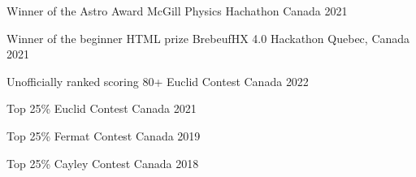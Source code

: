 



\begin{cvhonors}

  \cvhonor
    {Winner of the Astro Award} %
    {McGill Physics Hachathon} %
    {Canada} %
    {2021} %

  \cvhonor
    {Winner of the beginner HTML prize} %
    {BrebeufHX 4.0 Hackathon} %
    {Quebec, Canada} %
    {2021} %






  \cvhonor
    {Unofficially ranked scoring 80+} %
    {Euclid Contest} %
    {Canada} %
    {2022} %
    
  \cvhonor
    {Top 25\%} %
    {Euclid Contest} %
    {Canada} %
    {2021} %
    
  \cvhonor
    {Top 25\%} %
    {Fermat Contest} %
    {Canada} %
    {2019} %

  \cvhonor
    {Top 25\%} %
    {Cayley Contest} %
    {Canada} %
    {2018} %



\end{cvhonors}
